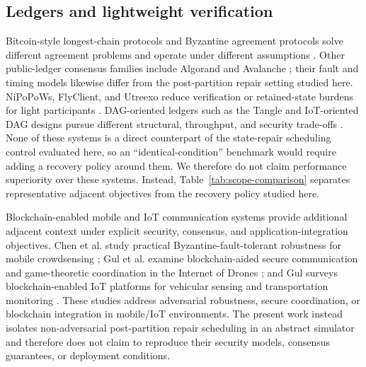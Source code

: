 \documentclass[11pt]{article}
\begin{document}
\subsection{Ledgers and lightweight verification}
Bitcoin-style longest-chain protocols and Byzantine agreement protocols solve different agreement problems and operate under different assumptions \cite{Nakamoto2008,CastroLiskov1999,Miller2016HoneyBadger}. Other public-ledger consensus families include Algorand and Avalanche \cite{Gilad2017Algorand,Rocket2019Avalanche}; their fault and timing models likewise differ from the post-partition repair setting studied here. NiPoPoWs, FlyClient, and Utreexo reduce verification or retained-state burdens for light participants \cite{Kiayias2020NIPoPoWs,Bunz2019FlyClient,Dryja2019Utreexo}. DAG-oriented ledgers such as the Tangle and IoT-oriented DAG designs pursue different structural, throughput, and security trade-offs \cite{Popov2017Tangle,Li2018DAGIoT}. None of these systems is a direct counterpart of the state-repair scheduling control evaluated here, so an ``identical-condition'' benchmark would require adding a recovery policy around them. We therefore do not claim performance superiority over these systems. Instead, Table~\ref{tab:scope-comparison} separates representative adjacent objectives from the recovery policy studied here.

Blockchain-enabled mobile and IoT communication systems provide additional adjacent context under explicit security, consensus, and application-integration objectives. Chen et al. study practical Byzantine-fault-tolerant robustness for mobile crowdsensing \cite{Chen2023PBFTMCS}; Gul et al. examine blockchain-aided secure communication and game-theoretic coordination in the Internet of Drones \cite{Gul2025IoD}; and Gul surveys blockchain-enabled IoT platforms for vehicular sensing and transportation monitoring \cite{Gul2022BlockchainIoT}. These studies address adversarial robustness, secure coordination, or blockchain integration in mobile/IoT environments. The present work instead isolates non-adversarial post-partition repair scheduling in an abstract simulator and therefore does not claim to reproduce their security models, consensus guarantees, or deployment conditions.
\end{document}
